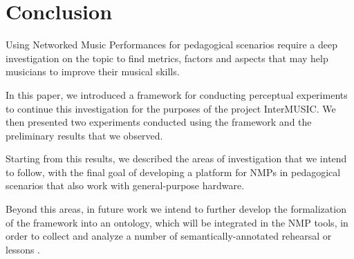 
\section{Conclusion}\label{sec:conclusion}

Using Networked Music Performances for pedagogical scenarios require a deep investigation on the topic to find metrics, factors and aspects that may help musicians to improve their musical skills.

In this paper, we introduced a framework for conducting perceptual experiments to continue this investigation for the purposes of the project InterMUSIC. We then presented two experiments conducted using the framework and the preliminary results that we observed.

Starting from this results, we described the areas of investigation that we intend to follow, with the final goal of developing a platform for NMPs in pedagogical scenarios that also work with general-purpose hardware.

Beyond this areas, in future work we intend to further develop the formalization of the framework into an ontology, which will be integrated in the NMP tools, in order to collect and analyze a number of semantically-annotated rehearsal or lessons \cite{Kolazi2013}. 